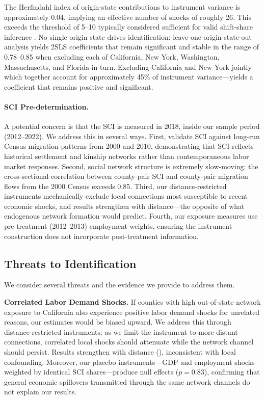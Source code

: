 \documentclass[12pt]{article}
\begin{document}
The Herfindahl index of origin-state contributions to instrument variance is approximately 0.04, implying an effective number of shocks of roughly 26. This exceeds the threshold of 5--10 typically considered sufficient for valid shift-share inference \citep{borusyak2022quasi}. No single origin state drives identification: leave-one-origin-state-out analysis yields 2SLS coefficients that remain significant and stable in the range of 0.78--0.85 when excluding each of California, New York, Washington, Massachusetts, and Florida in turn. Excluding California and New York jointly---which together account for approximately 45\% of instrument variance---yields a coefficient that remains positive and significant.

\paragraph{SCI Pre-determination.} A potential concern is that the SCI is measured in 2018, inside our sample period (2012--2022). We address this in several ways. First, \citet{bailey2018social} validate SCI against long-run Census migration patterns from 2000 and 2010, demonstrating that SCI reflects historical settlement and kinship networks rather than contemporaneous labor market responses. Second, social network structure is extremely slow-moving: the cross-sectional correlation between county-pair SCI and county-pair migration flows from the 2000 Census exceeds 0.85. Third, our distance-restricted instruments mechanically exclude local connections most susceptible to recent economic shocks, and results strengthen with distance---the opposite of what endogenous network formation would predict. Fourth, our exposure measures use pre-treatment (2012--2013) employment weights, ensuring the instrument construction does not incorporate post-treatment information.

\subsection{Threats to Identification}

We consider several threats and the evidence we provide to address them.

\textbf{Correlated Labor Demand Shocks.} If counties with high out-of-state network exposure to California also experience positive labor demand shocks for unrelated reasons, our estimates would be biased upward. We address this through distance-restricted instruments: as we limit the instrument to more distant connections, correlated local shocks should attenuate while the network channel should persist. Results strengthen with distance (), inconsistent with local confounding. Moreover, our placebo instruments---GDP and employment shocks weighted by identical SCI shares---produce null effects ($p = 0.83$), confirming that general economic spillovers transmitted through the same network channels do not explain our results.
\end{document}
